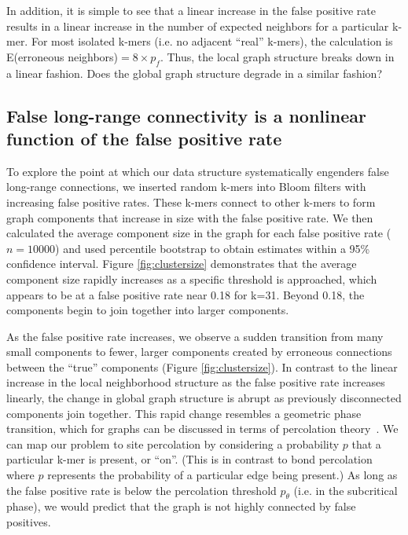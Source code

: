\documentclass{pnastwo}
\begin{document}
\begin{article}
In addition, it is simple to see that a linear increase in the false 
positive rate results in a linear increase in the number of expected 
neighbors for a particular k-mer. For most isolated k-mers (i.e. no adjacent 
``real'' k-mers), the calculation is 
E(erroneous neighbors)$ = 8 \times p_f$. Thus, the local graph 
structure breaks down in a linear fashion.  Does the global graph structure
degrade in a similar fashion?

\subsection{False long-range connectivity is a nonlinear function of the false positive rate}

To explore the point at which our data structure systematically
engenders false long-range connections, we inserted random k-mers
into Bloom filters with increasing false positive rates.  These k-mers
connect to other k-mers to form graph components that increase
in size with the false positive rate.
We then
calculated the average component size in the graph for each false positive rate
($n=10000$) and used percentile bootstrap to obtain estimates within a
95\% confidence interval. Figure \ref{fig:clustersize} demonstrates that the average component size
rapidly increases as a specific threshold is approached, which appears
to be at a false positive rate near 0.18 for k=31. Beyond 0.18, the components
begin to join together into larger components.

As the false positive rate increases, we observe a sudden transition
from many small components to fewer, larger components created by erroneous connections between the ``true'' components (Figure \ref{fig:clustersize}).  In contrast to the linear increase in the
local neighborhood structure as the false positive rate increases
linearly, the change in global graph structure is abrupt as previously
disconnected components join together.  This rapid change resembles a
geometric phase transition, which for graphs can be discussed in terms of
percolation theory~\cite{staufferintro}. We can map our problem to site percolation by
considering a probability $p$ that a particular k-mer is present, or ``on''. (This is in contrast to bond percolation where $p$ represents
the probability of a particular edge being present.) As
long as the false positive rate is below the percolation threshold
$p_\theta$ (i.e. in the subcritical phase), we would predict that the graph
is not highly connected by false positives.


\end{article}
\end{document}
